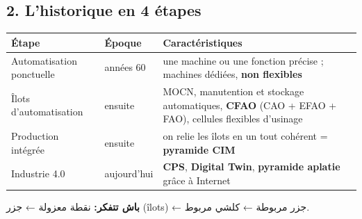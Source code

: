 \documentclass[11pt,a4paper]{article}
\newcommand{\fr}[1]{\textfrench{#1}}
\begin{document}
\subsection*{2. L'historique en 4 étapes}
\begin{center}
\begin{tabularx}{\linewidth}{l l X}
\toprule
\textbf{Étape} & \textbf{Époque} & \textbf{Caractéristiques} \\
\midrule
Automatisation ponctuelle & années 60 & une machine ou une fonction précise ; machines dédiées, \textbf{non flexibles} \\
Îlots d'automatisation & ensuite & MOCN, manutention et stockage automatiques, \textbf{CFAO} (CAO + EFAO + FAO), cellules flexibles d'usinage \\
Production intégrée & ensuite & on relie les îlots en un tout cohérent = \textbf{pyramide CIM} \\
Industrie 4.0 & aujourd'hui & \textbf{CPS}, \textbf{Digital Twin}, \textbf{pyramide aplatie} grâce à Internet \\
\bottomrule
\end{tabularx}
\end{center}
\begin{note}
\par\begin{Arabic}
\textbf{باش تتفكر:} نقطة معزولة ← جزر (\fr{îlots}) ← جزر مربوطة ← كلشي مربوط.
\end{Arabic}
\end{note}
\end{document}
